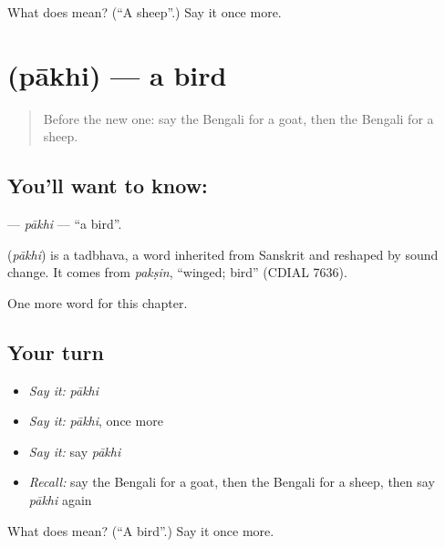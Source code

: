 \begin{tcolorbox}[breakable,colback=teal!4,colframe=teal!35!black,title={Before you move on}]
What does  mean? (\textquotedblleft{}A sheep\textquotedblright{}.) Say it once more.
\end{tcolorbox}
\section[\texorpdfstring{\bn{পাখি} (pākhi)}{পাখি (pākhi)}]{ (pākhi) — a bird}

\label{lesson:BN-C69-pakhi}



\begin{quote}
Before the new one: say the Bengali for a goat, then the Bengali for a sheep.
\end{quote}

\subsection*{You'll want to know: }
\textbf{} — \emph{pākhi} — \textquotedblleft{}a bird\textquotedblright{}.

\begin{cousinweb}
\textbf{} (\emph{pākhi}) is a tadbhava, a word inherited from Sanskrit and reshaped by sound change. It comes from \emph{pakṣin}, \textquotedblleft{}winged; bird\textquotedblright{} (CDIAL 7636).
\end{cousinweb}

\begin{grammarlens}[title={What you've built}]
One more word for this chapter.
\end{grammarlens}

\subsection*{Your turn}
\begin{itemize}
\raggedright
  \item \emph{Say it:} \emph{pākhi}
  \item \emph{Say it:} \emph{pākhi}, once more
  \item \emph{Say it:} say \emph{pākhi}
  \item \emph{Recall:} say the Bengali for a goat, then the Bengali for a sheep, then say \emph{pākhi} again
\end{itemize}

\begin{tcolorbox}[breakable,colback=teal!4,colframe=teal!35!black,title={Before you move on}]
What does  mean? (\textquotedblleft{}A bird\textquotedblright{}.) Say it once more.
\end{tcolorbox}
